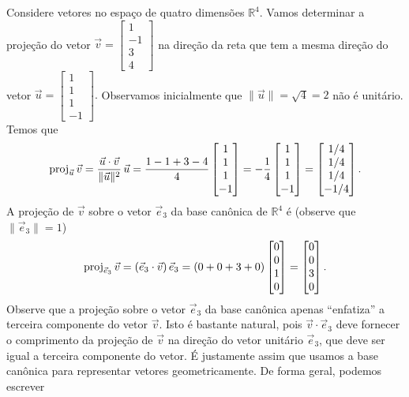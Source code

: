 \begin{ex}\label{canon}
	Considere vetores no espaço de quatro dimensões $\mathbb{R}^4$. Vamos determinar a projeção do vetor $\vec{v} =
	\begin{bmatrix}
	1 \\ -1 \\ 3 \\ 4
	\end{bmatrix}$ na direção da reta que tem a mesma direção do vetor $\vec{u} =
	\begin{bmatrix}
	1 \\ 1 \\ 1 \\ -1
	\end{bmatrix}.$ Observamos inicialmente que $\|\vec{u}\| = \sqrt{4} = 2$ não é unitário. Temos que
	\begin{equation}
	\operatorname{proj}_{\vec{u}} \vec{v} =  \frac{\vec{u} \cdot \vec{v}}{\|\vec{u}\|^2} \, \vec{u} = \frac{1 - 1 + 3 - 4}{4}
	\begin{bmatrix}
	1 \\ 1 \\ 1 \\ -1
	\end{bmatrix} =
	-\frac{1}{4}
	\begin{bmatrix}
	1 \\ 1 \\ 1 \\ -1
	\end{bmatrix} =
	\begin{bmatrix}
	1/4 \\ 1/4 \\ 1/4 \\ -1/4
	\end{bmatrix}.
	\end{equation} A projeção de $\vec{v}$ sobre o vetor $\vec{e}_3$ da base canônica de $\mathbb{R}^4$ é (observe que $\|\vec{e}_3\| = 1$)
	\begin{equation}
	\operatorname{proj}_{\vec{e}_3} \vec{v} = (\vec{e}_3 \cdot \vec{v}) \, \vec{e}_3 = (0 + 0 + 3 + 0)
	\begin{bmatrix}
	0 \\ 0 \\ 1 \\ 0
	\end{bmatrix} = \begin{bmatrix}
	0 \\ 0 \\ 3 \\ 0
	\end{bmatrix}.
	\end{equation} Observe que a projeção sobre o vetor $\vec{e}_3$ da base canônica apenas ``enfatiza'' a terceira componente do vetor $\vec{v}$. Isto é bastante natural, pois $\vec{v} \cdot \vec{e}_3$ deve fornecer o comprimento da projeção de $\vec{v}$ na direção do vetor unitário $\vec{e}_3$, que deve ser igual a terceira componente do vetor. É justamente assim que usamos a base canônica para representar vetores geometricamente. De forma geral, podemos escrever

\end{ex}
